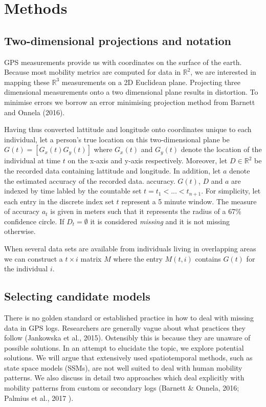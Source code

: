 \documentclass[english,man]{apa6}
\theoremstyle{definition}
\theoremstyle{definition}
\theoremstyle{definition}
\theoremstyle{remark}
\begin{document}
\section{Methods}\label{methods}

\subsection{Two-dimensional projections and
notation}\label{two-dimensional-projections-and-notation}

GPS measurements provide us with coordinates on the surface of the
earth. Because most mobility metrics are computed for data in
\(\mathbb{R}^2\), we are interested in mapping these \(\mathbb{R}^3\)
measurements on a 2D Euclidean plane. Projecting three dimensional
measurements onto a two dimensional plane results in distortion. To
minimise errors we borrow an error minimising projection method from
Barnett and Onnela (2016).

Having thus converted lattitude and longitude onto coordinates unique to
each individual, let a person's true location on this two-dimensional
plane be \(G(t) = [G_x(t) G_y(t)]\) where \(G_x(t)\) and \(G_y(t)\)
denote the location of the individual at time \(t\) on the x-axis and
y-axis respectively. Moreover, let \(D \in \mathbb{R}^2\) be the
recorded data containing lattitude and longitude. In addition, let \(a\)
denote the estimated accuracy of the recorded data. accuracy. \(G(t)\),
\(D\) and \(a\) are indexed by time labled by the countable set
\(t = t_1 < ... < t_{n+1}\). For simplicity, let each entry in the
discrete index set \(t\) represent a 5 minute window. The measure of
accuracy \(a_t\) is given in meters such that it represents the radius
of a 67\% confidence circle. If \(D_t = \emptyset\) it is considered
\emph{missing} and it is not missing otherwise.

When several data sets are available from individuals living in
overlapping areas we can construct a \(t \times i\) matrix \(M\) where
the entry \(M(t,i)\) contains \(G(t)\) for the individual \(i\).

\subsection{Selecting candidate
models}\label{selecting-candidate-models}

There is no golden standard or established practice in how to deal with
missing data in GPS logs. Researchers are generally vague about what
practices they follow (Jankowska et al., 2015). Ostensibly this is
because they are unaware of possible solutions. In an attempt to
elucidate the topic, we explore potential solutions. We will argue that
extensively used spatiotemporal methods, such as state space models
(SSMs), are not well suited to deal with human mobility patterns. We
also discuss in detail two approaches which deal explicitly with
mobility patterns from custom or secondary logs (Barnett \& Onnela,
2016; Palmius et al., 2017 ).
\end{document}
